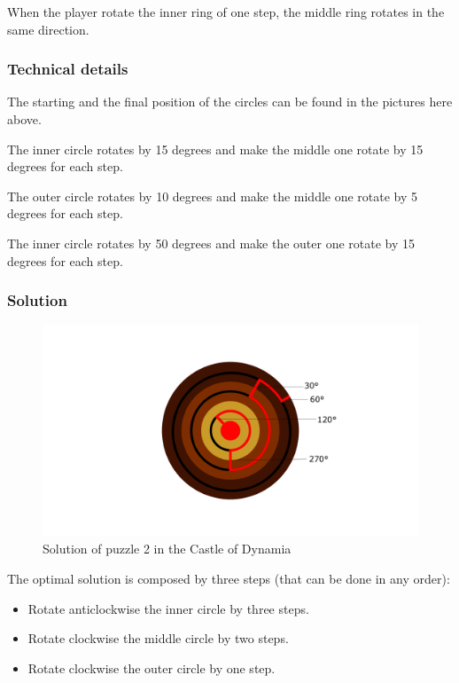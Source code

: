 When the player rotate the inner ring of one step, the middle ring rotates in the same direction.

\subsubsection*{Technical details}
The starting and the final position of the circles can be found in the pictures here above.

The inner circle rotates by 15 degrees and make the middle one rotate by 15 degrees for each step.

The outer circle rotates by 10 degrees and make the middle one rotate by 5 degrees for each step.

The inner circle rotates by 50 degrees and make the outer one rotate by 15 degrees for each step.

\subsubsection*{Solution}
\begin{figure}[H]
  \centering
  \includegraphics[width=\textwidth]{Images/Puzzles/castleOfDynamia2Solution}
  \caption{Solution of puzzle 2 in the Castle of Dynamia}
\end{figure}

The optimal solution is composed by three steps (that can be done in any order):
\begin{itemize}
	\item Rotate anticlockwise the inner circle by three steps.
	\item Rotate clockwise the middle circle by two steps.
	\item Rotate clockwise the outer circle by one step.
\end{itemize}

